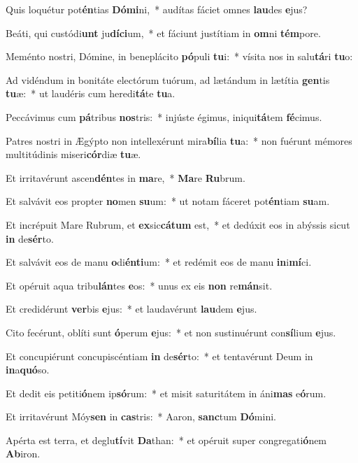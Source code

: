 \item Quis loquétur pot\textbf{én}tias \textbf{Dó}\textbf{mi}ni,~* audítas fáciet omnes \textbf{lau}des \textbf{e}jus?
\item Beáti, qui custódi\textbf{unt} ju\textbf{dí}\textbf{ci}um,~* et fáciunt justítiam in \textbf{om}ni \textbf{tém}pore.
\item Meménto nostri, Dómine, in beneplácito \textbf{pó}puli \textbf{tu}i:~* vísita nos in salu\textbf{tá}ri \textbf{tu}o:
\item Ad vidéndum in bonitáte electórum tuórum, ad lætándum in lætítia \textbf{gen}tis \textbf{tu}æ:~* ut laudéris cum heredi\textbf{tá}te \textbf{tu}a.
\item Peccávimus cum \textbf{pá}tribus \textbf{nos}tris:~* injúste égimus, iniqui\textbf{tá}tem \textbf{fé}cimus.
\item Patres nostri in Ægýpto non intellexérunt mira\textbf{bí}lia \textbf{tu}a:~* non fuérunt mémores multitúdinis miseri\textbf{cór}diæ \textbf{tu}æ.
\item Et irritavérunt ascen\textbf{dén}tes in \textbf{ma}re,~* \textbf{Ma}re \textbf{Ru}brum.
\item Et salvávit eos propter \textbf{no}men \textbf{su}um:~* ut notam fáceret pot\textbf{én}tiam \textbf{su}am.
\item Et incrépuit Mare Rubrum, et \textbf{ex}sic\textbf{cá}\textbf{tum} est,~* et dedúxit eos in abýssis sicut \textbf{in} de\textbf{sér}to.
\item Et salvávit eos de manu \textbf{o}di\textbf{én}\textbf{ti}um:~* et redémit eos de manu \textbf{in}i\textbf{mí}ci.
\item Et opéruit aqua tribu\textbf{lán}tes \textbf{e}os:~* unus ex eis \textbf{non} re\textbf{mán}sit.
\item Et credidérunt \textbf{ver}bis \textbf{e}jus:~* et laudavérunt \textbf{lau}dem \textbf{e}jus.
\item Cito fecérunt, oblíti sunt \textbf{ó}perum \textbf{e}jus:~* et non sustinuérunt con\textbf{sí}lium \textbf{e}jus.
\item Et concupiérunt concupiscéntiam \textbf{in} de\textbf{sér}to:~* et tentavérunt Deum in \textbf{in}a\textbf{quó}so.
\item Et dedit eis petiti\textbf{ó}nem ip\textbf{só}rum:~* et misit saturitátem in áni\textbf{mas} e\textbf{ó}rum.
\item Et irritavérunt Móy\textbf{sen} in \textbf{cas}tris:~* Aaron, \textbf{sanc}tum \textbf{Dó}mini.
\item Apérta est terra, et deglu\textbf{tí}vit \textbf{Da}than:~* et opéruit super congregati\textbf{ó}nem \textbf{Ab}iron.
